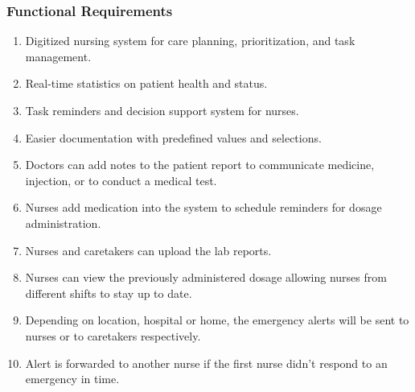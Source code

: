 \subsubsection{Functional Requirements}
\begin{enumerate}
    \item Digitized nursing system for care planning, prioritization, and task management.
    \item Real-time statistics on patient health and status.
    \item Task reminders and decision support system for nurses.
    \item Easier documentation with predefined values and selections.
    \item Doctors can add notes to the patient report to communicate medicine, injection, or to conduct a medical test.
    \item Nurses add medication into the system to schedule reminders for dosage administration.
    \item Nurses and caretakers can upload the lab reports.
    \item Nurses can view the previously administered dosage allowing nurses from different shifts to stay up to date.
    \item Depending on location, hospital or home, the emergency alerts will be sent to nurses or to caretakers respectively.
    \item Alert is forwarded to another nurse if the first nurse didn't respond to an emergency in time.

\end{enumerate}
